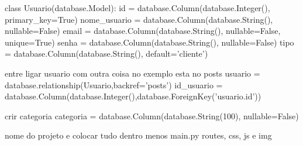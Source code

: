class Usuario(database.Model):
    id = database.Column(database.Integer(), primary_key=True)
    nome_usuario = database.Column(database.String(), nullable=False)
    email = database.Column(database.String(), nullable=False, unique=True)
    senha = database.Column(database.String(), nullable=False)
    tipo = database.Column(database.String(), default='cliente')

    entre ligar usuario com outra coisa no exemplo esta no posts
    usuario = database.relationship(Usuario,backref='posts')
    id_usuario = database.Column(database.Integer(),database.ForeignKey('usuario.id'))

    crir categoria
    categoria = database.Column(database.String(100), nullable=False)
% 

nome do projeto e colocar tudo dentro menos main.py
routes, css, js e img
% 